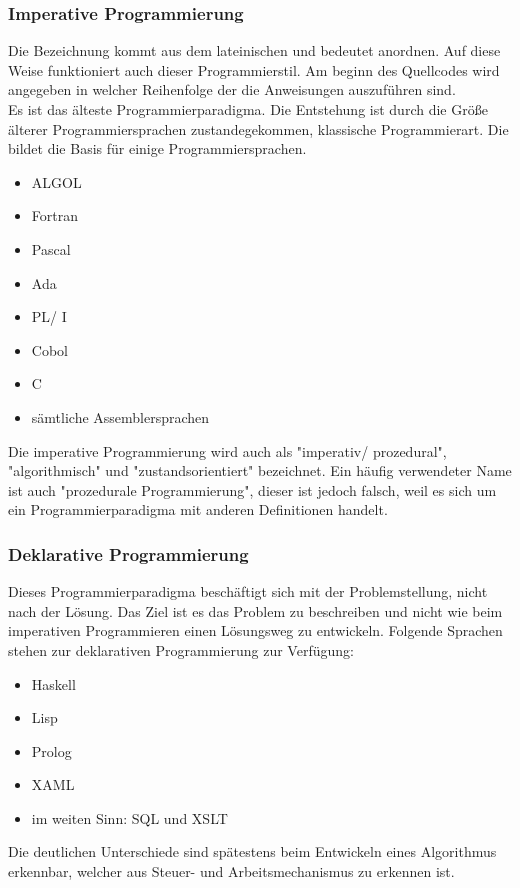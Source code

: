 \documentclass[12pt,a4paper]{report}
\begin{document}
\subsubsection{Imperative Programmierung}
Die Bezeichnung kommt aus dem lateinischen und bedeutet anordnen. Auf diese Weise funktioniert auch dieser Programmierstil. Am beginn des Quellcodes wird angegeben in welcher Reihenfolge der die Anweisungen auszuführen sind.\\

Es ist das älteste Programmierparadigma. Die Entstehung ist durch die Größe älterer Programmiersprachen zustandegekommen, klassische Programmierart. Die bildet die Basis für einige Programmiersprachen.
\begin{itemize}
\item ALGOL
\item Fortran
\item Pascal
\item Ada
\item PL/ I
\item Cobol
\item C
\item sämtliche Assemblersprachen
\end{itemize}
Die imperative Programmierung wird auch als "{}imperativ/ prozedural"{}, "{}algorithmisch"{} und "{}zustandsorientiert"{} bezeichnet. Ein häufig verwendeter Name ist auch "{}prozedurale Programmierung"{}, dieser ist jedoch falsch, weil es sich um ein Programmierparadigma mit anderen Definitionen handelt.

\subsubsection{Deklarative Programmierung}
Dieses Programmierparadigma beschäftigt sich mit der Problemstellung, nicht nach der Lösung. Das Ziel ist es das Problem zu beschreiben und nicht wie beim imperativen Programmieren einen Lösungsweg zu entwickeln.
Folgende Sprachen stehen zur deklarativen Programmierung zur Verfügung:
\begin{itemize}
\item Haskell
\item Lisp
\item Prolog
\item XAML
\item im weiten Sinn: SQL und XSLT
\end{itemize} 
Die deutlichen Unterschiede sind spätestens beim Entwickeln eines Algorithmus erkennbar, welcher aus Steuer- und Arbeitsmechanismus zu erkennen ist.\\
\end{document}
